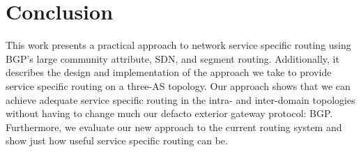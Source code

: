

\section{Conclusion}
\label{sec:conclusion}

This work presents a practical approach to network service specific routing
using BGP's large community attribute, SDN, and segment routing. Additionally,
it describes the design and implementation of the approach we take to provide
service specific routing on a three-AS topology. Our approach shows that we 
can achieve adequate service specific routing in the intra- and inter-domain
topologies without having to change much our defacto exterior gateway protocol:
BGP. Furthermore, we evaluate our new approach to the current routing system
and show just how useful service specific routing can be.


